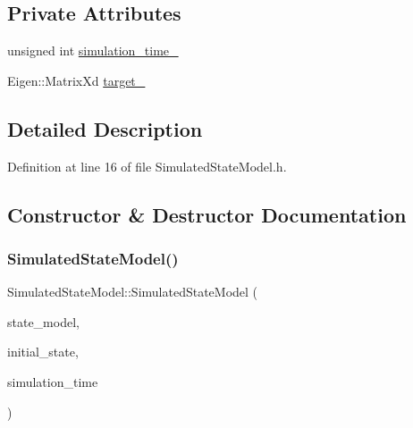 \subsection*{Private Attributes}
\begin{DoxyCompactItemize}
\item 
unsigned int \mbox{\hyperlink{classbfl_1_1SimulatedStateModel_a1cb1c318a4c3ad56e995ca0f1878e67e}{simulation\+\_\+time\+\_\+}}
\item 
Eigen\+::\+Matrix\+Xd \mbox{\hyperlink{classbfl_1_1SimulatedStateModel_a0f1d1cc526d7797b3999b793ff39fd2d}{target\+\_\+}}
\end{DoxyCompactItemize}


\subsection{Detailed Description}


Definition at line 16 of file Simulated\+State\+Model.\+h.



\subsection{Constructor \& Destructor Documentation}
\mbox{\label{classbfl_1_1SimulatedStateModel_a46fd7b491ec8e7e152faa07f9d46f815}} 
\subsubsection{\texorpdfstring{Simulated\+State\+Model()}{SimulatedStateModel()}}
{\footnotesize\ttfamily Simulated\+State\+Model\+::\+Simulated\+State\+Model (\begin{DoxyParamCaption}\item[{std\+::unique\+\_\+ptr$<$ \mbox{\hyperlink{classbfl_1_1StateModel}{State\+Model}} $>$}]{state\+\_\+model,  }\item[{const Eigen\+::\+Ref$<$ const Eigen\+::\+Vector\+Xd $>$ \&}]{initial\+\_\+state,  }\item[{const unsigned int}]{simulation\+\_\+time }\end{DoxyParamCaption})}



